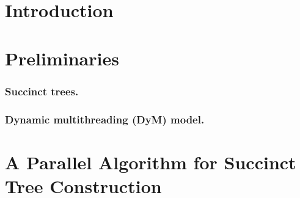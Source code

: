 \documentclass[runningheads]{llncs}
\begin{document}
\section{Introduction}
\label{sec:introduction}




\section{Preliminaries}
\label{sec:relwork}


\subsubsection{Succinct trees.}
\label{subsec:suctrees}


\subsubsection{Dynamic multithreading (DyM) model.}
\label{subsec:dym}


%


\section{A Parallel Algorithm for Succinct Tree Construction}
\label{sec:multicoreST}
%
%

\end{document}
